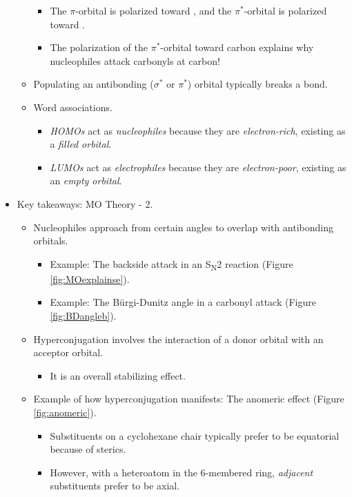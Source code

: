 \documentclass[../notes.tex]{subfiles}
\begin{document}
\begin{itemize}
\begin{itemize}
\begin{itemize}
            \item The $\pi$-orbital is polarized toward , and the $\pi^*$-orbital is polarized toward .
            \item The polarization of the $\pi^*$-orbital toward carbon explains why nucleophiles attack carbonyls at carbon!
        \end{itemize}
        \item Populating an antibonding ($\sigma^*$ or $\pi^*$) orbital typically breaks a bond.
        \item Word associations.
        \begin{itemize}
            \item \emph{HOMOs} act as \emph{nucleophiles} because they are \emph{electron-rich}, existing as a \emph{filled orbital}.
            \item \emph{LUMOs} act as \emph{electrophiles} because they are \emph{electron-poor}, existing as an \emph{empty orbital}.
        \end{itemize}
    \end{itemize}
    \item Key takeaways: MO Theory - 2.
    \begin{itemize}
        \item Nucleophiles approach from certain angles to overlap with antibonding orbitals.
        \begin{itemize}
            \item Example: The backside attack in an S\textsubscript{N}2 reaction (Figure \ref{fig:MOexplainse}).
            \item Example: The B\"{u}rgi-Dunitz angle in a carbonyl attack (Figure \ref{fig:BDangleb}).
        \end{itemize}
        \item Hyperconjugation involves the interaction of a donor orbital with an acceptor orbital.
        \begin{itemize}
            \item It is an overall stabilizing effect.
        \end{itemize}
        \item Example of how hyperconjugation manifests: The anomeric effect (Figure \ref{fig:anomeric}).
        \begin{itemize}
            \item Substituents on a cyclohexane chair typically prefer to be equatorial because of sterics.
            \item However, with a heteroatom in the 6-membered ring, \emph{adjacent} substituents prefer to be axial.

\end{itemize}
\end{itemize}
\end{itemize}
\end{document}
